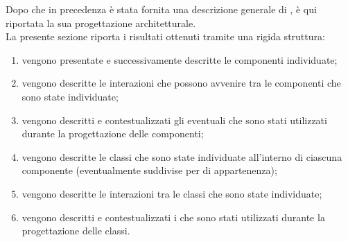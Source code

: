 	Dopo che in precedenza è stata fornita una descrizione generale di , è qui riportata la sua progettazione architetturale.\\
	La presente sezione riporta i risultati ottenuti tramite una rigida struttura:
	\begin{enumerate}
		\item vengono presentate e successivamente descritte le componenti individuate;
		\item vengono descritte le interazioni che possono avvenire tra le componenti che sono state individuate;
		\item vengono descritti e contestualizzati gli eventuali  che sono stati utilizzati durante la progettazione delle componenti;
		\item vengono descritte le classi che sono state individuate all'interno di ciascuna componente (eventualmente suddivise per  di appartenenza);
		\item vengono descritte le interazioni tra le classi che sono state individuate;
		\item vengono descritti e contestualizzati i  che sono stati utilizzati durante la progettazione delle classi.
	\end{enumerate}

